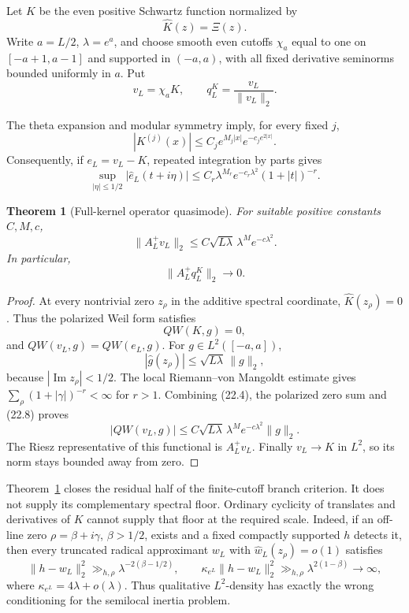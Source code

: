 \documentclass[11pt]{amsart}
\newtheorem{theorem}{Theorem}[section]
\theoremstyle{definition}
\theoremstyle{remark}
\begin{document}
Let \(K\) be the even positive Schwartz function normalized by
\[
 \widehat K(z)=\Xi(z).
\tag{22.1}
\]
Write \(a=L/2\), \(\lambda=e^a\), and choose smooth even cutoffs
\(\chi_a\) equal to one on \([-a+1,a-1]\) and supported in
\((-a,a)\), with all fixed derivative seminorms bounded uniformly in
\(a\).  Put
\[
 v_L=\chi_aK,\qquad q_L^K=\frac{v_L}{\|v_L\|_2}.
\tag{22.2}
\]

The theta expansion and modular symmetry imply, for every fixed \(j\),
\[
 |K^{(j)}(x)|
 \le C_j e^{M_j|x|}e^{-c_je^{2|x|}}.
\tag{22.3}
\]
Consequently, if \(e_L=v_L-K\), repeated integration by parts gives
\[
 \sup_{|\eta|\le1/2}|\widehat e_L(t+i\eta)|
 \le C_r\lambda^{M_r}e^{-c_r\lambda^2}(1+|t|)^{-r}.
\tag{22.4}
\]

\begin{theorem}[Full-kernel operator quasimode]
\label{thm:full-kernel-quasimode}
For suitable positive constants \(C,M,c\),
\[
 \|A_L^+v_L\|_2
 \le C\sqrt{L\lambda}\,\lambda^Me^{-c\lambda^2}.
\tag{22.5}
\]
In particular,
\[
 \|A_L^+q_L^K\|_2\longrightarrow0.
\tag{22.6}
\]
\end{theorem}

\begin{proof}
At every nontrivial zero \(z_\rho\) in the additive spectral coordinate,
\(\widehat K(z_\rho)=0\).  Thus the polarized Weil form satisfies
\[
 QW(K,g)=0,
\tag{22.7}
\]
and \(QW(v_L,g)=QW(e_L,g)\).  For \(g\in L^2([-a,a])\),
\[
 |\widehat g(z_\rho)|
 \le\sqrt{L\lambda}\,\|g\|_2,
\tag{22.8}
\]
because \(|\operatorname{Im}z_\rho|<1/2\).  The local
Riemann--von Mangoldt estimate gives
\(\sum_\rho(1+|\gamma|)^{-r}<\infty\) for \(r>1\).  Combining
(22.4), the polarized zero sum and (22.8) proves
\[
 |QW(v_L,g)|
 \le C\sqrt{L\lambda}\,\lambda^Me^{-c\lambda^2}\|g\|_2.
\]
The Riesz representative of this functional is \(A_L^+v_L\).  Finally
\(v_L\to K\) in \(L^2\), so its norm stays bounded away from zero.
\end{proof}

Theorem~\ref{thm:full-kernel-quasimode} closes the residual half of the
finite-cutoff branch criterion.  It does not supply its complementary
spectral floor.  Ordinary cyclicity of translates and derivatives of
\(K\) cannot supply that floor at the required scale.  Indeed, if an
off-line zero \(\rho=\beta+i\gamma\), \(\beta>1/2\), exists and a
fixed compactly supported \(h\) detects it, then every truncated radical
approximant \(w_L\) with
\(\widehat w_L(z_\rho)=o(1)\) satisfies
\[
 \|h-w_L\|_2^2\gg_{h,\rho}
 \lambda^{-2(\beta-1/2)},\qquad
 \kappa_{e^L}\|h-w_L\|_2^2
 \gg_{h,\rho}\lambda^{2(1-\beta)}\longrightarrow\infty,
\tag{22.9}
\]
where \(\kappa_{e^L}=4\lambda+o(\lambda)\).  Thus qualitative
\(L^2\)-density has exactly the wrong conditioning for the semilocal
inertia problem.
\end{document}
